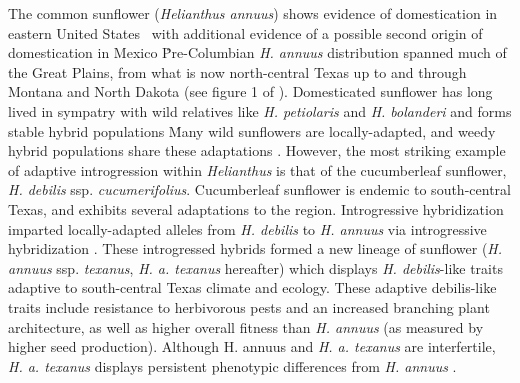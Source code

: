 \documentclass[11pt]{article}
\begin{document}
\begin{enumerate}
\begin{enumerate}
The common sunflower (\emph{Helianthus annuus}) shows evidence of domestication in eastern United States \cite{harter2004origin, wills2006chloroplast}\, with additional evidence of a possible second origin of domestication in Mexico \cite{lentz2008sunflower}\.
Pre-Columbian \emph{H. annuus} distribution spanned much of the Great Plains, from what is now north-central Texas up to and through Montana and North Dakota (see figure 1 of \cite{whitney2010adaptive}).
Domesticated sunflower has long lived in sympatry with wild relatives like \emph{H. petiolaris} and \emph{H. bolanderi} and forms stable hybrid populations \cite{schwarzbach2002likely, rieseberg1988molecular, welch2002patterns}\.
Many wild sunflowers are locally-adapted, and weedy hybrid populations share these adaptations \cite{kane2008genetics}.
However, the most striking example of adaptive introgression within \emph{Helianthus} is that of the cucumberleaf sunflower, \emph{H. debilis} ssp. \emph{cucumerifolius}.
Cucumberleaf sunflower is endemic to south-central Texas, and exhibits several adaptations to the region.
Introgressive hybridization imparted locally-adapted alleles from \emph{H. debilis} to \emph{H. annuus} via introgressive hybridization \cite{heiser1951hybridization}. 
These introgressed hybrids formed a new lineage of sunflower (\emph{H. annuus} ssp. \emph{texanus}, \emph{H. a. texanus} hereafter) which displays \emph{H. debilis}-like traits adaptive to south-central Texas climate and ecology.
These adaptive debilis-like traits include resistance to herbivorous pests and an increased branching plant architecture, as well as higher overall fitness than \emph{H. annuus} (as measured by higher seed production)\cite{whitney2006adaptive}.
Although H. annuus and \emph{H. a. texanus} are interfertile, \emph{H. a. texanus} displays persistent phenotypic differences from \emph{H. annuus} \cite{rieseberg2007hybridization}.



\end{enumerate}
\end{enumerate}
\end{document}

